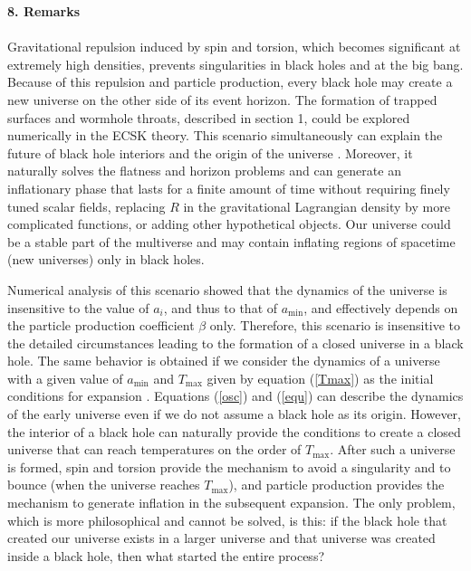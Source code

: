 \documentclass[prd,onecolumn,nofootinbib]{revtex4}
\begin{document}
{\bf 8. Remarks}\\ \\
Gravitational repulsion induced by spin and torsion, which becomes significant at extremely high densities, prevents singularities in black holes and at the big bang.
Because of this repulsion and particle production, every black hole may create a new universe on the other side of its event horizon.
The formation of trapped surfaces and wormhole throats, described in section 1, could be explored numerically in the ECSK theory.
This scenario simultaneously can explain the future of black hole interiors and the origin of the universe \cite{torsion1}.
Moreover, it naturally solves the flatness and horizon problems and can generate an inflationary phase that lasts for a finite amount of time without requiring finely tuned scalar fields, replacing $R$ in the gravitational Lagrangian density by more complicated functions, or adding other hypothetical objects.
Our universe could be a stable part of the multiverse and may contain inflating regions of spacetime (new universes) only in black holes.

Numerical analysis of this scenario \cite{Sha} showed that the dynamics of the universe is insensitive to the value of $a_i$, and thus to that of $a_\textrm{min}$, and effectively depends on the particle production coefficient $\beta$ only.
Therefore, this scenario is insensitive to the detailed circumstances leading to the formation of a closed universe in a black hole.
The same behavior is obtained if we consider the dynamics of a universe with a given value of $a_\textrm{min}$ and $T_\textrm{max}$ given by equation (\ref{Tmax}) as the initial conditions for expansion \cite{Sha}.
Equations (\ref{osc}) and (\ref{equ}) can describe the dynamics of the early universe even if we do not assume a black hole as its origin.
However, the interior of a black hole can naturally provide the conditions to create a closed universe that can reach temperatures on the order of $T_\textrm{max}$.
After such a universe is formed, spin and torsion provide the mechanism to avoid a singularity and to bounce (when the universe reaches $T_\textrm{max}$), and particle production provides the mechanism to generate inflation in the subsequent expansion.
The only problem, which is more philosophical and cannot be solved, is this: if the black hole that created our universe exists in a larger universe and that universe was created inside a black hole, then what started the entire process?
\end{document}
